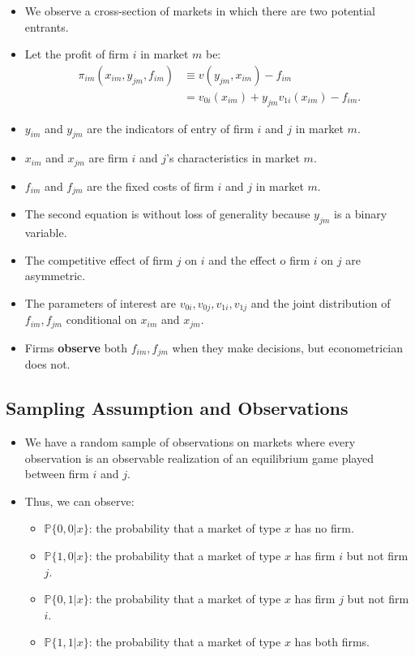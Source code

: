 \documentclass[
]{book}
\providecommand{\tightlist}{%
  \setlength{\itemsep}{0pt}\setlength{\parskip}{0pt}}
\begin{document}
\begin{itemize}
\tightlist
\item
  We observe a cross-section of markets in which there are two potential entrants.
\item
  Let the profit of firm \(i\) in market \(m\) be:
  \[
  \begin{split}
  \pi_{im}(x_{im}, y_{jm}, f_{im}) & \equiv v(y_{jm}, x_{im}) - f_{im}\\
  &=v_{0i}(x_{im}) + y_{jm} v_{1i}(x_{im}) - f_{im}.
  \end{split}
  \]
\item
  \(y_{im}\) and \(y_{jm}\) are the indicators of entry of firm \(i\) and \(j\) in market \(m\).
\item
  \(x_{im}\) and \(x_{jm}\) are firm \(i\) and \(j\)'s characteristics in market \(m\).
\item
  \(f_{im}\) and \(f_{jm}\) are the fixed costs of firm \(i\) and \(j\) in market \(m\).
\item
  The second equation is without loss of generality because \(y_{jm}\) is a binary variable.
\item
  The competitive effect of firm \(j\) on \(i\) and the effect o firm \(i\) on \(j\) are asymmetric.
\item
  The parameters of interest are \(v_{0i}, v_{0j}, v_{1i}, v_{1j}\) and the joint distribution of \(f_{im}, f_{jm}\) conditional on \(x_{im}\) and \(x_{jm}\).
\item
  Firms \textbf{observe} both \(f_{im}, f_{jm}\) when they make decisions, but econometrician does not.
\end{itemize}

\hypertarget{sampling-assumption-and-observations}{%
\subsection{Sampling Assumption and Observations}\label{sampling-assumption-and-observations}}

\begin{itemize}
\tightlist
\item
  We have a random sample of observations on markets where every observation is an observable realization of an equilibrium game played between firm \(i\) and \(j\).
\item
  Thus, we can observe:

  \begin{itemize}
  \tightlist
  \item
    \(\mathbb{P}\{0, 0|x\}\): the probability that a market of type \(x\) has no firm.
  \item
    \(\mathbb{P}\{1, 0|x\}\): the probability that a market of type \(x\) has firm \(i\) but not firm \(j\).
  \item
    \(\mathbb{P}\{0, 1|x\}\): the probability that a market of type \(x\) has firm \(j\) but not firm \(i\).
  \item
    \(\mathbb{P}\{1, 1|x\}\): the probability that a market of type \(x\) has both firms.
  \end{itemize}
\end{itemize}
\end{document}
